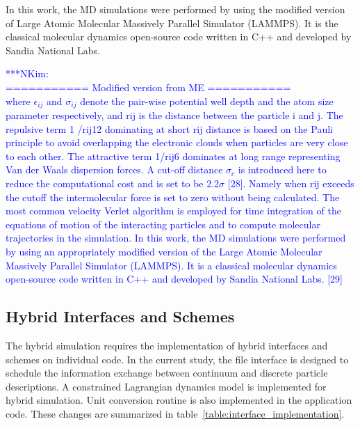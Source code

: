 \documentclass[preprint,12pt]{elsarticle}
\newcommand{\Nkimnote}[1]{ {\textcolor{blue} { ***NKim: #1 }}}
\newcommand{\Nkimnote}[1]{}
\begin{document}
In this work,  the MD simulations were performed by using the modified version of Large Atomic Molecular Massively Parallel Simulator (LAMMPS). It is the classical molecular dynamics open-source code written in C++ and developed by Sandia National Labs.~\cite{LAMMPS}

\Nkimnote{
\\=========== Modified version from ME ===========\\
where  $\epsilon_{ij}$ and $\sigma_{ij}$ denote the pair-wise potential well depth and the atom size parameter respectively, and rij is the distance between the particle i and j. The repulsive term 1 /rij12 dominating at short rij distance is based on the Pauli principle to avoid overlapping the electronic clouds when particles are very close to each other. The attractive term 1/rij6 dominates at long range representing Van der Waals dispersion forces. A cut-off distance $\sigma_{c}$  is introduced here to reduce the computational cost and is set to be 2.2$\sigma$  [28]. Namely when rij exceeds the cutoff the intermolecular force is set to zero without being calculated.
The most common velocity Verlet algorithm is employed for time integration of the equations of motion of the interacting particles and to compute molecular trajectories in the simulation. 
In this work, the MD simulations were performed by using an appropriately modified version of the Large Atomic Molecular Massively Parallel Simulator (LAMMPS). It is a classical molecular dynamics open-source code written in C++ and developed by Sandia National Labs. [29]
\\}


\subsection{Hybrid Interfaces and Schemes}
The hybrid simulation requires the implementation of hybrid interfaces and schemes on individual code. In the current study, the file interface is designed to schedule the information exchange between continuum and discrete particle descriptions.  A constrained Lagrangian dynamics model is implemented for hybrid simulation. Unit conversion routine is also implemented in the application code. These changes are summarized in table~\ref{table:interface_implementation}.
\end{document}
